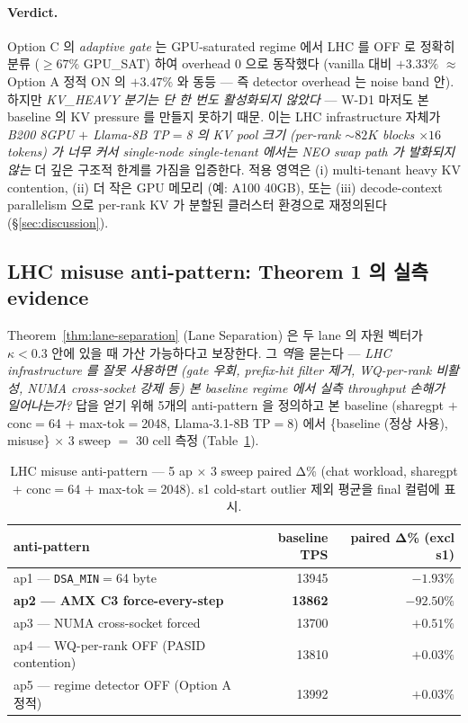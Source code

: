 {\paragraph{Verdict.}
Option C 의 \emph{adaptive gate} 는 GPU-saturated regime 에서 LHC 를 OFF 로
정확히 분류 ($\ge\!67\%$ GPU\_SAT) 하여 overhead 0 으로 동작했다 (vanilla 대비
$+3.33\%$ $\approx$ Option A 정적 ON 의 $+3.47\%$ 와 동등 — 즉 detector overhead
는 noise band 안). 하지만 \emph{KV\_HEAVY 분기는 단 한 번도 활성화되지 않았다}
— W-D1 마저도 본 baseline 의 KV pressure 를 만들지 못하기 때문. 이는
LHC infrastructure 자체가 \emph{B200 8GPU $+$ Llama-8B TP$=$8 의 KV pool
크기 (per-rank $\sim\!82\!K$ blocks $\times 16$ tokens) 가 너무 커서
single-node single-tenant 에서는 NEO swap path 가 발화되지 않는} 더 깊은
구조적 한계를 가짐을 입증한다. 적용 영역은 (i) multi-tenant heavy KV
contention, (ii) 더 작은 GPU 메모리 (예: A100 40GB), 또는 (iii) decode-context
parallelism 으로 per-rank KV 가 분할된 클러스터 환경으로 재정의된다
(\S\ref{sec:discussion}).

\subsection{LHC misuse anti-pattern: Theorem 1 의 실측 evidence}
\label{subsec:res-misuse}

Theorem~\ref{thm:lane-separation} (Lane Separation) 은 두 lane 의 자원 벡터가
$\kappa < 0.3$ 안에 있을 때 가산 가능하다고 보장한다. 그 \emph{역}을 묻는다 ---
\emph{LHC infrastructure 를 잘못 사용하면 (gate 우회, prefix-hit filter 제거,
WQ-per-rank 비활성, NUMA cross-socket 강제 등) 본 baseline regime 에서
실측 throughput 손해가 일어나는가?} 답을 얻기 위해 5개의 anti-pattern 을
정의하고 본 baseline (sharegpt $+$ conc$=$64 $+$ max-tok$=$2048, Llama-3.1-8B
TP$=$8) 에서 \{baseline (정상 사용), misuse\} $\times$ 3 sweep $=$ 30 cell
측정 (Table~\ref{tbl:misuse-summary}).

\begin{table}[t]
\centering
\small
\caption{LHC misuse anti-pattern --- 5 ap $\times$ 3 sweep paired Δ\%
(chat workload, sharegpt $+$ conc$=$64 $+$ max-tok$=$2048).
s1 cold-start outlier 제외 평균을 final 컬럼에 표시.}
\label{tbl:misuse-summary}
\begin{tabular}{lrr}
\toprule
anti-pattern & baseline TPS & paired Δ\% (excl s1) \\
\midrule
ap1 — \texttt{DSA\_MIN}$=$64 byte                 & 13945 & $-1.93\%$ \\
\textbf{ap2 — AMX C3 force-every-step}            & \textbf{13862} & \textbf{$-92.50\%$} \\
ap3 — NUMA cross-socket forced                    & 13700 & $+0.51\%$ \\
ap4 — WQ-per-rank OFF (PASID contention)          & 13810 & $+0.03\%$ \\
ap5 — regime detector OFF (Option A 정적)        & 13992 & $+0.03\%$ \\
\bottomrule
\end{tabular}
\end{table}

}
